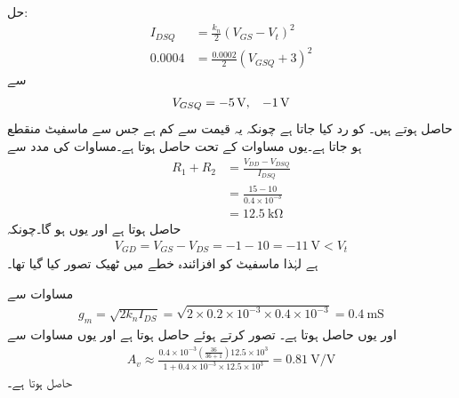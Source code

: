 حل:
\begin{align*}
I_{DSQ}&=\frac{k_n}{2} \left(V_{GS}-V_t \right)^2\\
0.0004&=\frac{0.0002}{2} \left(V_{GSQ}+3 \right)^2
\end{align*}
سے
\begin{align*}
V_{GSQ}=\SI{-5}{\volt},\hspace{3mm} \SI{-1}{\volt}
\end{align*}
حاصل ہوتے ہیں۔ کو رد کیا جاتا ہے چونکہ یہ قیمت  سے کم ہے جس سے ماسفیٹ منقطع ہو جاتا ہے۔یوں مساوات  کے تحت  حاصل ہوتا ہے۔مساوات  کی مدد سے
\begin{align*}
R_1+R_2&=\frac{V_{DD}-V_{DSQ}}{I_{DSQ}}\\
&=\frac{15-10}{0.4 \times 10^{-3}}\\
&=\SI{12.5}{\kilo \ohm}
\end{align*}
حاصل ہوتا ہے اور یوں  ہو گا۔چونکہ
\begin{align*}
V_{GD}=V_{GS}-V_{DS}=-1-10=\SI{-11}{\volt} < V_t
\end{align*}
ہے لہٰذا ماسفیٹ کو افزائندہ خطے میں ٹھیک تصور کیا گیا تھا۔

مساوات  سے 
\begin{align*}
g_m=\sqrt{2 k_n I_{DS}}=\sqrt{2 \times 0.2 \times 10^{-3} \times 0.4 \times 10^{-3}}=\SI{0.4}{\milli \siemens}
\end{align*}
اور یوں  حاصل ہوتا ہے۔ تصور کرتے ہوئے  حاصل ہوتا ہے اور یوں مساوات  سے
\begin{align*}
A_v \approx \frac{0.4 \times 10^{-3} \left(\frac{36}{36+1}\right) 12.5 \times 10^{3}}{1+0.4 \times 10^{-3}\times 12.5 \times 10^{3}}=\SI{0.81}{\volt \per \volt}
\end{align*}
حاصل ہوتا ہے۔

